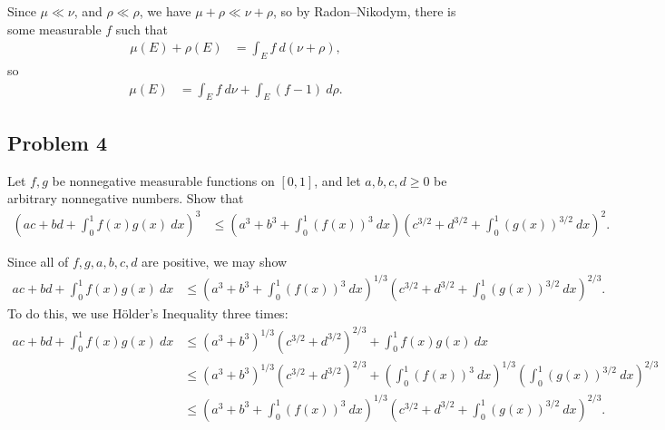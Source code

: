 \documentclass[10pt]{mypackage}
\begin{document}
Since $\mu\ll\nu$, and $\rho\ll\rho$, we have $\mu + \rho \ll \nu + \rho$, so by Radon--Nikodym, there is some measurable $f$ such that
\begin{align*}
  \mu\left( E \right) + \rho\left( E \right) &= \int_{E}^{} f\:d\left( \nu + \rho \right),
\end{align*}
so
\begin{align*}
  \mu\left( E \right) &= \int_{E}^{} f\:d\nu + \int_{E}^{} \left( f-1 \right)\:d\rho.
\end{align*}
\subsection{Problem 4}%
\begin{problem}
  Let $f,g$ be nonnegative measurable functions on $[0,1]$, and let $a,b,c,d\geq 0$ be arbitrary nonnegative numbers. Show that
  \begin{align*}
    \left( ac + bd + \int_{0}^{1} f(x)g(x)\:dx \right)^3 &\leq \left( a^3 + b^3 + \int_{0}^{1} \left( f(x) \right)^3\:dx \right)\left( c^{3/2} + d^{3/2} + \int_{0}^{1} \left( g(x) \right)^{3/2}\:dx \right)^2.
  \end{align*}
\end{problem}
Since all of $f,g,a,b,c,d$ are positive, we may show
\begin{align*}
  ac + bd + \int_{0}^{1} f(x)g(x)\:dx &\leq \left( a^3 + b^3 + \int_{0}^{1} \left( f(x) \right)^3\:dx \right)^{1/3}\left( c^{3/2} + d^{3/2} + \int_{0}^{1} \left( g(x) \right)^{3/2}\:dx \right)^{2/3}.
\end{align*}
To do this, we use Hölder's Inequality three times:
\begin{align*}
  ac + bd + \int_{0}^{1} f(x)g(x)\:dx &\leq \left( a^3 + b^3 \right)^{1/3}\left( c^{3/2} + d^{3/2} \right)^{2/3} + \int_{0}^{1} f(x)g(x)\:dx\\
                                      &\leq \left( a^3 + b^3 \right)^{1/3}\left( c^{3/2} + d^{3/2} \right)^{2/3} + \left( \int_{0}^{1} \left( f(x) \right)^{3}\:dx \right)^{1/3}\left( \int_{0}^{1} \left( g(x) \right)^{3/2}\:dx \right)^{2/3}\\
                                      &\leq \left( a^3 + b^3 + \int_{0}^{1} \left( f(x) \right)^{3}\:dx \right)^{1/3}\left( c^{3/2} + d^{3/2} + \int_{0}^{1} \left( g(x) \right)^{3/2}\:dx \right)^{2/3}.
\end{align*}
\end{document}

